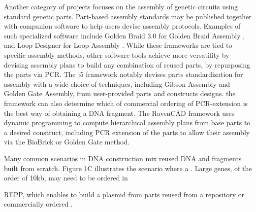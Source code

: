 Another category of projects focuses on the assembly of genetic circuits using standard genetic parts. Part-based assembly standards may be published together with companion software to help users devise assembly protocols. Examples of such specialized software include Golden Braid 3.0 for Golden Braid Assembly \citep{Vazquez-Vilar2017}, and Loop Designer for Loop Assembly \citep{Pollak2019}. While these frameworks are tied to specific assembly methods, other software tools achieve more versatility by devising assembly plans to build any combination of reused parts, by repurposing the parts via PCR. The j5  framework \citep{Hillson2012} notably devises parts standardization for assembly with a wide choice of techniques, including Gibson Assembly and Golden Gate Assembly, from user-provided parts and constructs designs. the framework can also determine which of commercial ordering of PCR-extension is the best way of obtaining a DNA fragment. The RavenCAD framework \citep{Appleton2014} uses dynamic programming to compute hierarchical assembly plans from base parts to a desired construct, including PCR extension of the parts to allow their assembly via the BioBrick or Golden Gate method.

Many common scenarios in DNA construction mix reused DNA and fragments built from scratch. Figure 1C illustrates the scenario where a . Large genes, of the order of 10kb, may need to be ordered in 

REPP, which enables to build a plasmid from parts reused from a repository or commercially ordered \citep{Timmons2020}.










